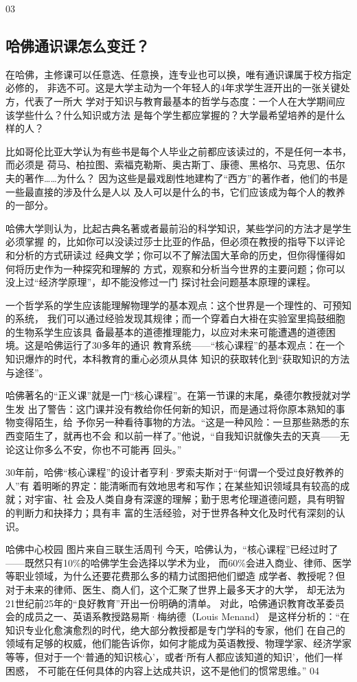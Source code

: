 \documentclass[11pt]{ctexart}
\begin{document}
{{{{03
\subsection{哈佛通识课怎么变迁？}
\label{sec:org3e2a6ab}
在哈佛，主修课可以任意选、任意换，连专业也可以换，唯有通识课属于校方指定必修的，
非选不可。这是大学主动为一个年轻人的4年求学生涯开出的一张关键处方，代表了一所大
学对于知识与教育最基本的哲学与态度：一个人在大学期间应该学些什么？什么知识或方法
是每个学生都应掌握的？大学最希望培养的是什么样的人？

比如哥伦比亚大学认为有些书是每个人毕业之前都应该读过的，不是任何一本书，而必须是
荷马、柏拉图、索福克勒斯、奥古斯丁、康德、黑格尔、马克思、伍尔夫的著作……为什么？
因为这些是最戏剧性地建构了“西方”的著作者，他们的书是一些最直接的涉及什么是人以
及人可以是什么的书，它们应该成为每个人的教养的一部分。

哈佛大学则认为，比起古典名著或者最前沿的科学知识，某些学问的方法才是学生必须掌握
的，比如你可以没读过莎士比亚的作品，但必须在教授的指导下以评论和分析的方式研读过
经典文学；你可以不了解法国大革命的历史，但你得懂得如何将历史作为一种探究和理解的
方式，观察和分析当今世界的主要问题；你可以没上过“经济学原理”，却不能没修过一门
探讨社会问题基本原理的课程。

一个哲学系的学生应该能理解物理学的基本观点：这个世界是一个理性的、可预知的系统，
我们可以通过经验发现其规律；而一个穿着白大褂在实验室里捣鼓细胞的生物系学生应该具
备最基本的道德推理能力，以应对未来可能遭遇的道德困境。这是哈佛运行了30多年的通识
教育系统——“核心课程”的基本观点：在一个知识爆炸的时代，本科教育的重心必须从具体
知识的获取转化到“获取知识的方法与途径”。

哈佛著名的“正义课”就是一门“核心课程”。在第一节课的末尾，桑德尔教授就对学生发
出了警告：这门课并没有教给你任何新的知识，而是通过将你原本熟知的事物变得陌生，给
予你另一种看待事物的方法。“这是一种风险：一旦那些熟悉的东西变陌生了，就再也不会
和以前一样了。”他说，“自我知识就像失去的天真——无论这让你多么不安，你也不可能再
回头。”

30年前，哈佛“核心课程”的设计者亨利·罗索夫斯对于“何谓一个受过良好教养的人”有
着明晰的界定：能清晰而有效地思考和写作；在某些知识领域具有较高的成就；对宇宙、社
会及人类自身有深邃的理解；勤于思考伦理道德问题，具有明智的判断力和抉择力；具有丰
富的生活经验，对于世界各种文化及时代有深刻的认识。

哈佛中心校园
图片来自三联生活周刊
今天，哈佛认为，“核心课程”已经过时了——既然只有10\%的哈佛学生会选择以学术为业，
而60\%会进入商业、律师、医学等职业领域，为什么还要花费那么多的精力试图把他们塑造
成学者、教授呢？但对于未来的律师、医生、商人们，这个汇聚了世界上最多天才的大学，
却无法为21世纪前25年的“良好教育”开出一份明确的清单。
对此，哈佛通识教育改革委员会的成员之一、英语系教授路易斯·梅纳德（Louis Menand）
是这样分析的：“在知识专业化愈演愈烈的时代，绝大部分教授都是专门学科的专家，他们
在自己的领域有足够的权威，他们能告诉你，如何才能成为英语教授、物理学家、经济学家
等等，但对于一个‘普通的知识核心’，或者‘所有人都应该知道的知识’，他们一样困惑，
不可能在任何具体的内容上达成共识，这不是他们的惯常思维。”
04
}}}}
\end{document}
